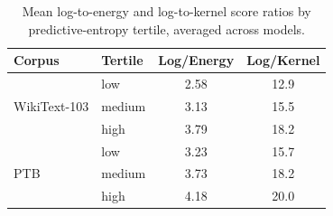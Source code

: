 \documentclass{article}
\begin{document}
\begin{table}[H]
  \caption{Mean log-to-energy and log-to-kernel score ratios by predictive-entropy
  tertile, averaged across models.}
  \label{tab:entropy}
  \centering
  \small
  \begin{tabular}{llcc}
    \toprule
    Corpus & Tertile & Log/Energy & Log/Kernel \\
    \midrule
    \multirow{3}{*}{WikiText-103} & low    & 2.58 & 12.9 \\
                                  & medium & 3.13 & 15.5 \\
                                  & high   & 3.79 & 18.2 \\
    \midrule
    \multirow{3}{*}{PTB}          & low    & 3.23 & 15.7 \\
                                  & medium & 3.73 & 18.2 \\
                                  & high   & 4.18 & 20.0 \\
    \bottomrule
  \end{tabular}
\end{table}
\end{document}
